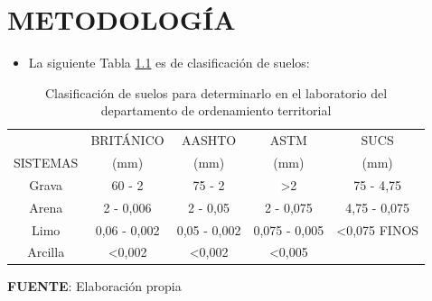 \chapter{METODOLOGÍA}
\thispagestyle{empty}

\begin{itemize}[leftmargin=1em]
    \item La siguiente Tabla \ref{tab:my-table1} es de clasificación de suelos:
\end{itemize}
\begin{table}[H]
\centering
\begin{threeparttable}
\caption[Clasificación de suelos]{Clasificación de suelos para determinarlo en el laboratorio del departamento de ordenamiento territorial}
\label{tab:my-table1}
\begin{tabular}{@{}ccccc@{}}
\hline
\multicolumn{1}{c}{} &
  \multicolumn{1}{c}{BRITÁNICO} &
  \multicolumn{1}{c}{AASHTO} &
  \multicolumn{1}{c}{ASTM} &
  \multicolumn{1}{c}{SUCS} \\ \cline{2-5} 
\multicolumn{1}{c}{\multirow{-2}{*}{SISTEMAS}} &
  \multicolumn{1}{c}{{\color[HTML]{4D5156} (mm)}} &
  \multicolumn{1}{c}{{\color[HTML]{4D5156} (mm)}} &
  \multicolumn{1}{c}{{\color[HTML]{4D5156} (mm)}} &
  \multicolumn{1}{c}{{\color[HTML]{4D5156} (mm)}} \\ \hline
\multicolumn{1}{c}{Grava} &
  \multicolumn{1}{c}{60 - 2} &
  \multicolumn{1}{c}{75 - 2} &
  \multicolumn{1}{c}{\textgreater 2} &
  \multicolumn{1}{c}{75 - 4,75} \\ \hline
\multicolumn{1}{c}{Arena} &
  \multicolumn{1}{c}{2 - 0,006} &
  \multicolumn{1}{c}{2 - 0,05} &
  \multicolumn{1}{c}{2 - 0,075} &
  \multicolumn{1}{c}{4,75 - 0,075} \\ \hline
\multicolumn{1}{c}{Limo} &
  \multicolumn{1}{c}{0,06 - 0,002} &
  \multicolumn{1}{c}{0,05 - 0,002} &
  \multicolumn{1}{c}{0,075 - 0,005} &
  \multicolumn{1}{c}{\textless 0,075 FINOS} \\ \hline
\multicolumn{1}{c}{Arcilla} &
  \multicolumn{1}{c}{\textless  0,002} &
  \multicolumn{1}{c}{\textless  0,002} &
  \multicolumn{1}{c}{\textless  0,005} &
  \multicolumn{1}{c}{} \\ \hline
\end{tabular}
    \begin{tablenotes}
    \vspace{-0.5cm}
      \item {{\fontsize{10pt}{ \baselineskip}\selectfont \textbf{FUENTE}: Elaboración propia}}
    \end{tablenotes}
\end{threeparttable}
\end{table}


